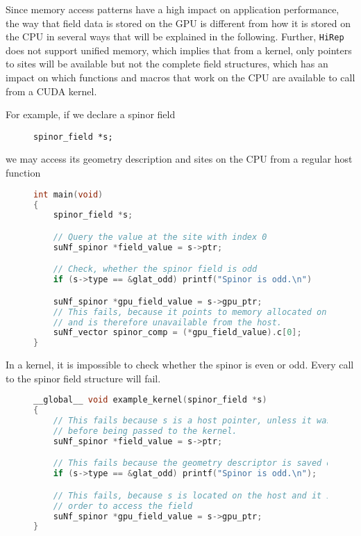 \documentclass[12pt]{article}
\begin{document}
Since memory access patterns have a high impact on application performance, the way that field data is stored on the GPU is different from how it is stored on the CPU in several ways that will be explained in the following. Further, \texttt{HiRep} does not support unified memory, which implies that from a kernel, only pointers to sites will be available but not the complete field structures, which has an impact on which functions and macros that work on the CPU are available to call from a CUDA kernel. \par

For example, if we declare a spinor field

\begin{figure}[H]
\begin{lstlisting}[caption=Declare spinor field]
spinor_field *s;
\end{lstlisting}
\end{figure}

we may access its geometry description and sites on the CPU from a regular host function
\begin{figure}[H]
\begin{lstlisting}[caption=Example for host function,language=C]
int main(void)
{
    spinor_field *s;

    // Query the value at the site with index 0
    suNf_spinor *field_value = s->ptr;

    // Check, whether the spinor field is odd
    if (s->type == &glat_odd) printf("Spinor is odd.\n")

    suNf_spinor *gpu_field_value = s->gpu_ptr;
    // This fails, because it points to memory allocated on the GPU
    // and is therefore unavailable from the host.
    suNf_vector spinor_comp = (*gpu_field_value).c[0];
}
\end{lstlisting}
\end{figure}

In a kernel, it is impossible to check whether the spinor is even or odd. Every call to the spinor field structure will fail.

\begin{figure}[H]
\begin{lstlisting}[caption=Example for kernel,language=C]
__global__ void example_kernel(spinor_field *s)
{
    // This fails because s is a host pointer, unless it was transferred
    // before being passed to the kernel.
    suNf_spinor *field_value = s->ptr;

    // This fails because the geometry descriptor is saved on the host
    if (s->type == &glat_odd) printf("Spinor is odd.\n");

    // This fails, because s is located on the host and it is accessed in
    // order to access the field
    suNf_spinor *gpu_field_value = s->gpu_ptr;
}
\end{lstlisting}
\end{figure}
\end{document}
